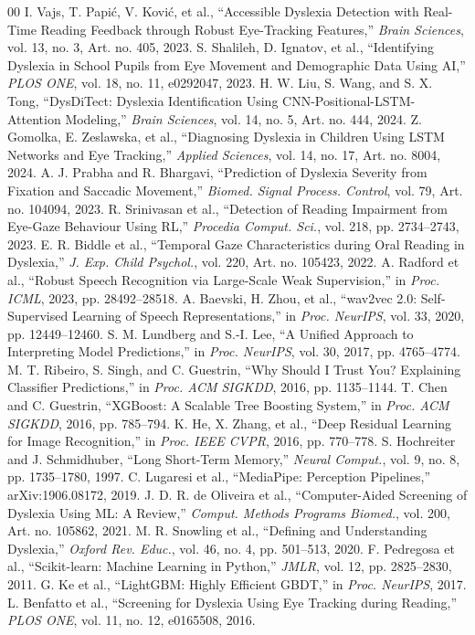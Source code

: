 \documentclass[conference]{IEEEtran}
\begin{document}
\begin{thebibliography}{00}
 I. Vajs, T. Papi\'c, V. Kovi\'c, et al., ``Accessible Dyslexia Detection with Real-Time Reading Feedback through Robust Eye-Tracking Features,'' \textit{Brain Sciences}, vol. 13, no. 3, Art. no. 405, 2023.
 S. Shalileh, D. Ignatov, et al., ``Identifying Dyslexia in School Pupils from Eye Movement and Demographic Data Using AI,'' \textit{PLOS ONE}, vol. 18, no. 11, e0292047, 2023.
 H. W. Liu, S. Wang, and S. X. Tong, ``DysDiTect: Dyslexia Identification Using CNN-Positional-LSTM-Attention Modeling,'' \textit{Brain Sciences}, vol. 14, no. 5, Art. no. 444, 2024.
 Z. Gomolka, E. Zeslawska, et al., ``Diagnosing Dyslexia in Children Using LSTM Networks and Eye Tracking,'' \textit{Applied Sciences}, vol. 14, no. 17, Art. no. 8004, 2024.
 A. J. Prabha and R. Bhargavi, ``Prediction of Dyslexia Severity from Fixation and Saccadic Movement,'' \textit{Biomed. Signal Process. Control}, vol. 79, Art. no. 104094, 2023.
 R. Srinivasan et al., ``Detection of Reading Impairment from Eye-Gaze Behaviour Using RL,'' \textit{Procedia Comput. Sci.}, vol. 218, pp. 2734--2743, 2023.
 E. R. Biddle et al., ``Temporal Gaze Characteristics during Oral Reading in Dyslexia,'' \textit{J. Exp. Child Psychol.}, vol. 220, Art. no. 105423, 2022.
 A. Radford et al., ``Robust Speech Recognition via Large-Scale Weak Supervision,'' in \textit{Proc. ICML}, 2023, pp. 28492--28518.
 A. Baevski, H. Zhou, et al., ``wav2vec 2.0: Self-Supervised Learning of Speech Representations,'' in \textit{Proc. NeurIPS}, vol. 33, 2020, pp. 12449--12460.
 S. M. Lundberg and S.-I. Lee, ``A Unified Approach to Interpreting Model Predictions,'' in \textit{Proc. NeurIPS}, vol. 30, 2017, pp. 4765--4774.
 M. T. Ribeiro, S. Singh, and C. Guestrin, ``Why Should I Trust You? Explaining Classifier Predictions,'' in \textit{Proc. ACM SIGKDD}, 2016, pp. 1135--1144.
 T. Chen and C. Guestrin, ``XGBoost: A Scalable Tree Boosting System,'' in \textit{Proc. ACM SIGKDD}, 2016, pp. 785--794.
 K. He, X. Zhang, et al., ``Deep Residual Learning for Image Recognition,'' in \textit{Proc. IEEE CVPR}, 2016, pp. 770--778.
 S. Hochreiter and J. Schmidhuber, ``Long Short-Term Memory,'' \textit{Neural Comput.}, vol. 9, no. 8, pp. 1735--1780, 1997.
 C. Lugaresi et al., ``MediaPipe: Perception Pipelines,'' arXiv:1906.08172, 2019.
 J. D. R. de Oliveira et al., ``Computer-Aided Screening of Dyslexia Using ML: A Review,'' \textit{Comput. Methods Programs Biomed.}, vol. 200, Art. no. 105862, 2021.
 M. R. Snowling et al., ``Defining and Understanding Dyslexia,'' \textit{Oxford Rev. Educ.}, vol. 46, no. 4, pp. 501--513, 2020.
 F. Pedregosa et al., ``Scikit-learn: Machine Learning in Python,'' \textit{JMLR}, vol. 12, pp. 2825--2830, 2011.
 G. Ke et al., ``LightGBM: Highly Efficient GBDT,'' in \textit{Proc. NeurIPS}, 2017.
 L. Benfatto et al., ``Screening for Dyslexia Using Eye Tracking during Reading,'' \textit{PLOS ONE}, vol. 11, no. 12, e0165508, 2016.
\end{thebibliography}
\end{document}
